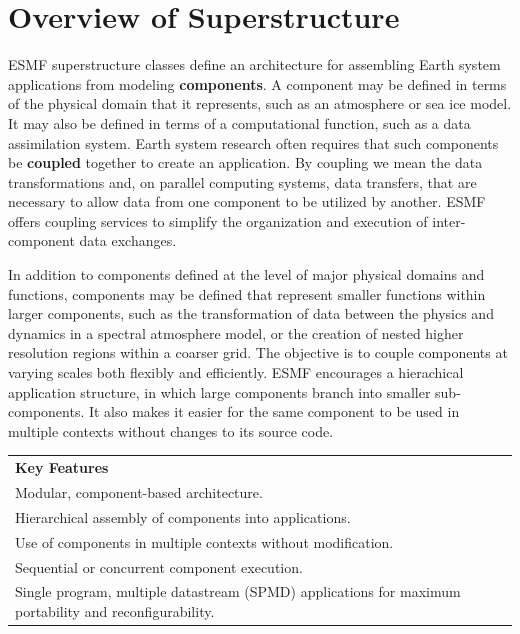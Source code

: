 %

\section{Overview of Superstructure}

ESMF superstructure classes define an architecture for assembling
Earth system applications from modeling {\bf components}.  A component
may be defined in terms of the physical domain that it represents,
such as an atmosphere or sea ice model.  It may also be defined in terms
of a computational function, such as a data assimilation system.
Earth system research often requires that such components be {\bf coupled} 
together to create an application.  By coupling we mean the data 
transformations and, on parallel computing systems, data transfers, 
that are necessary to allow data from one component to be utilized by 
another.  ESMF offers coupling services to simplify the organization and 
execution of inter-component data exchanges.  

In addition to components defined at the level of major physical 
domains and functions, components may be defined that represent 
smaller functions within larger components, such as the transformation 
of data between the physics and dynamics in a spectral atmosphere model, 
or the creation of nested higher resolution regions 
within a coarser grid.  The objective is to couple components at varying 
scales both flexibly and efficiently.  ESMF encourages a hierachical
application structure, in which large components branch into 
smaller sub-components.  It also makes it easier for the same 
component to be used in multiple contexts without changes to its 
source code.

\begin{center}  
\begin{tabular}{|p{6in}|}
\hline
\vspace{.01in}
{\bf Key Features} \\[.01in]
Modular, component-based architecture. \\
Hierarchical assembly of components into applications.\\
Use of components in multiple contexts without modification.\\
Sequential or concurrent component execution.\\
Single program, multiple datastream (SPMD) applications for 
maximum portability and reconfigurability.\\[.03in] \hline
\end{tabular}
\end{center}

